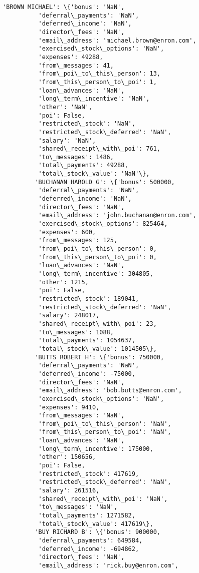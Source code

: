\documentclass[11pt]{article}
\begin{document}
\begin{Verbatim}[commandchars=\\\{\}]
         'BROWN MICHAEL': \{'bonus': 'NaN',
          'deferral\_payments': 'NaN',
          'deferred\_income': 'NaN',
          'director\_fees': 'NaN',
          'email\_address': 'michael.brown@enron.com',
          'exercised\_stock\_options': 'NaN',
          'expenses': 49288,
          'from\_messages': 41,
          'from\_poi\_to\_this\_person': 13,
          'from\_this\_person\_to\_poi': 1,
          'loan\_advances': 'NaN',
          'long\_term\_incentive': 'NaN',
          'other': 'NaN',
          'poi': False,
          'restricted\_stock': 'NaN',
          'restricted\_stock\_deferred': 'NaN',
          'salary': 'NaN',
          'shared\_receipt\_with\_poi': 761,
          'to\_messages': 1486,
          'total\_payments': 49288,
          'total\_stock\_value': 'NaN'\},
         'BUCHANAN HAROLD G': \{'bonus': 500000,
          'deferral\_payments': 'NaN',
          'deferred\_income': 'NaN',
          'director\_fees': 'NaN',
          'email\_address': 'john.buchanan@enron.com',
          'exercised\_stock\_options': 825464,
          'expenses': 600,
          'from\_messages': 125,
          'from\_poi\_to\_this\_person': 0,
          'from\_this\_person\_to\_poi': 0,
          'loan\_advances': 'NaN',
          'long\_term\_incentive': 304805,
          'other': 1215,
          'poi': False,
          'restricted\_stock': 189041,
          'restricted\_stock\_deferred': 'NaN',
          'salary': 248017,
          'shared\_receipt\_with\_poi': 23,
          'to\_messages': 1088,
          'total\_payments': 1054637,
          'total\_stock\_value': 1014505\},
         'BUTTS ROBERT H': \{'bonus': 750000,
          'deferral\_payments': 'NaN',
          'deferred\_income': -75000,
          'director\_fees': 'NaN',
          'email\_address': 'bob.butts@enron.com',
          'exercised\_stock\_options': 'NaN',
          'expenses': 9410,
          'from\_messages': 'NaN',
          'from\_poi\_to\_this\_person': 'NaN',
          'from\_this\_person\_to\_poi': 'NaN',
          'loan\_advances': 'NaN',
          'long\_term\_incentive': 175000,
          'other': 150656,
          'poi': False,
          'restricted\_stock': 417619,
          'restricted\_stock\_deferred': 'NaN',
          'salary': 261516,
          'shared\_receipt\_with\_poi': 'NaN',
          'to\_messages': 'NaN',
          'total\_payments': 1271582,
          'total\_stock\_value': 417619\},
         'BUY RICHARD B': \{'bonus': 900000,
          'deferral\_payments': 649584,
          'deferred\_income': -694862,
          'director\_fees': 'NaN',
          'email\_address': 'rick.buy@enron.com',

\end{Verbatim}
\end{document}
